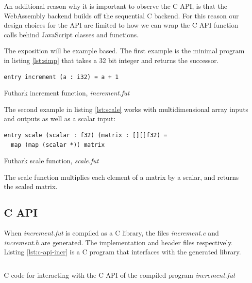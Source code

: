 \documentclass[11pt]{book}
\begin{document}
An additional reason why it is important to observe the C API, is that the WebAssembly backend builds off the sequential C backend. For this reason our design choices for the API are limited to how we can wrap the C API function calls behind JavaScript classes and functions.

The exposition will be example based.
The first example is the minimal program in listing \ref{lst:simp} that takes a 32 bit integer and returns the successor.
\begin{listing}[H]
\begin{verbatim}
entry increment (a : i32) = a + 1
\end{verbatim}
\caption{Futhark increment function, \textit{increment.fut}}
\label{lst:simp}
\end{listing}

The second example in listing \ref{lst:scale} works with multidimensional array inputs and outputs as well as a scalar input:
\begin{listing}[H]
\begin{verbatim}
entry scale (scalar : f32) (matrix : [][]f32) = 
  map (map (scalar *)) matrix
\end{verbatim}
\caption{Futhark scale function, \textit{scale.fut}}
\label{lst:scale}
\end{listing}
The scale function multiplies each element of a matrix by a scalar, and returns the scaled matrix.


\subsection{C API}


When \textit{increment.fut} is compiled as a C library, the files \textit{increment.c} and \textit{increment.h} are generated. The implementation and header files respectively. Listing \ref{lst:c-api-incr} is a C program that interfaces with the generated library. 

\begin{listing}[h!] 
\inputminted[fontsize=\small,baselinestretch=0.5,linenos]{C}{code/compiler/api_examples/increment.c}
\caption{C code for interacting with the C API of the compiled program \textit{increment.fut} }
\label{lst:c-api-incr}    
\end{listing} 
\end{document}
